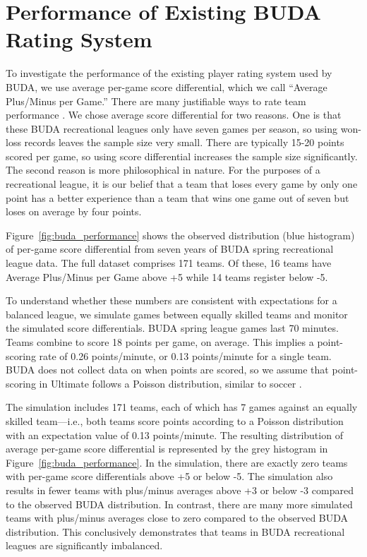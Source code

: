 \section{Performance of Existing BUDA Rating System}\label{sec:existing_performance}

To investigate the performance of the existing player rating system used by BUDA, we use average per-game score differential, which we call ``Average Plus/Minus per Game.'' There are many justifiable ways to rate team performance \cite{Langville_2012}.  We chose average score differential for two reasons.  One is that these BUDA recreational leagues only have seven games per season, so using won-loss records leaves the sample size very small.  There are typically 15-20 points scored per game, so using score differential increases the sample size significantly.  The second reason is more philosophical in nature.  For the purposes of a recreational league, it is our belief that a team that loses every game by only one point has a better experience than a team that wins one game out of seven but loses on average by four points.  

Figure~\ref{fig:buda_performance} shows the observed distribution (blue histogram) of per-game score differential from seven years of BUDA spring recreational league data.  The full dataset comprises 171 teams.  Of these, 16 teams have Average Plus/Minus per Game above +5 while 14 teams register below -5.  

To understand whether these numbers are consistent with expectations for a balanced league, we simulate games between equally skilled teams and monitor the simulated score differentials.  BUDA spring league games last 70 minutes.  Teams combine to score 18 points per game, on average. This implies a point-scoring rate of 0.26 points/minute, or 0.13 points/minute for a single team.  BUDA does not collect data on when points are scored, so we assume that point-scoring in Ultimate follows a Poisson distribution, similar to soccer \cite{Heuer_2010}.

The simulation includes 171 teams, each of which has 7 games against an equally skilled team---i.e., both teams score points according to a Poisson distribution with an expectation value of 0.13 points/minute. The resulting distribution of average per-game score differential is represented by the grey histogram in Figure~\ref{fig:buda_performance}.  In the simulation, there are exactly zero teams with per-game score differentials above +5 or below -5.  The simulation also results in fewer teams with plus/minus averages above +3 or below -3 compared to the observed BUDA distribution.  In contrast, there are many more simulated teams with plus/minus averages close to zero compared to the observed BUDA distribution.  This conclusively demonstrates that teams in BUDA recreational leagues are significantly imbalanced.

